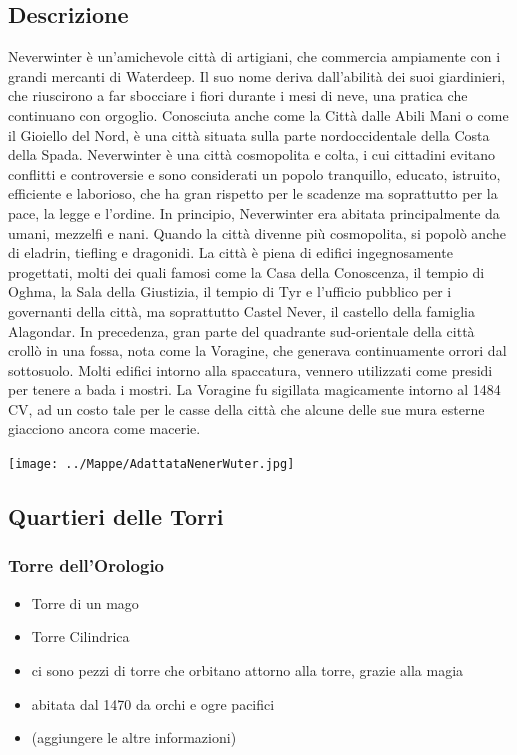 \documentclass{article}
\begin{document}
\subsection{Descrizione} Neverwinter è un’amichevole città di artigiani, che commercia ampiamente con i grandi mercanti di Waterdeep. Il suo nome deriva dall’abilità dei suoi giardinieri, che riuscirono a far sbocciare i fiori durante i mesi di neve, una pratica che continuano con orgoglio. Conosciuta anche come la Città dalle Abili Mani o come il Gioiello del Nord, è una città situata sulla parte nordoccidentale della Costa della Spada. Neverwinter è una città cosmopolita e colta, i cui cittadini evitano conflitti e controversie e sono considerati un popolo tranquillo, educato, istruito, efficiente e laborioso, che ha gran rispetto per le scadenze ma soprattutto per la pace, la legge e l’ordine. In principio, Neverwinter era abitata principalmente da umani, mezzelfi e nani. Quando la città divenne più cosmopolita, si popolò anche di eladrin, tiefling e dragonidi.
La città è piena di edifici ingegnosamente progettati, molti dei quali famosi come la Casa della Conoscenza, il tempio di Oghma, la Sala della Giustizia, il tempio di Tyr e l’ufficio pubblico per i governanti della città, ma soprattutto Castel Never, il castello della famiglia Alagondar. In precedenza, gran parte del quadrante sud-orientale della città crollò in una fossa, nota come la Voragine, che generava continuamente orrori dal sottosuolo. Molti edifici intorno alla spaccatura, vennero utilizzati come presidi per tenere a bada i mostri. La Voragine fu sigillata magicamente intorno al 1484 CV, ad un costo tale per le casse della città che alcune delle sue mura esterne giacciono ancora come macerie.




\begin{landscape}
        \texttt{[image: ../Mappe/AdattataNenerWuter.jpg]}
       
   
    
\end{landscape}

\subsection{Quartieri delle Torri}
\subsubsection{Torre dell'Orologio}
\begin{itemize}
    \item Torre di un mago
    \item Torre Cilindrica
    \item ci sono pezzi di torre che orbitano attorno alla torre, grazie alla magia
    \item abitata dal 1470 da orchi e ogre pacifici
    \item (aggiungere le altre informazioni)
\end{itemize}
\end{document}
